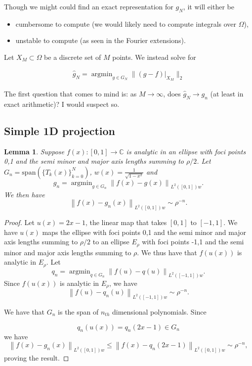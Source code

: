 \documentclass{article}
\DeclareMathOperator*{\argmin}{argmin}
\newtheorem{lemma}[theorem]{Lemma}
\newcommand{\lp}{\left(}
\newcommand{\rp}{\right)}
\newcommand{\C}{\mathbb{C}}
\begin{document}
Though we might could find an exact representation for $g_N$, it will either be
\begin{itemize}
\item cumbersome to compute (we would likely need to compute integrals over $\Omega$),
\item unstable to compute (as seen in the Fourier extensions).
\end{itemize}

Let $X_M \subset \Omega$ be a discrete set of $M$ points. We instead solve for

\begin{align}
\hat{g}_N = \argmin_{g \in G_N} \| \left . (g-f) \right |_{X_M} \|_2
\end{align}

The first question that comes to mind is: as $M \to \infty$, does $\hat{g}_N \to g_n$ (at least in exact arithmetic)? I would suspect so.

\subsection{Simple 1D projection}
\begin{lemma}
Suppose $f(x):[0,1]\to \C$ is analytic in an ellipse with foci points 0,1 and the semi minor and major axis lengths summing to $\rho/2$. Let $G_n = \text{span} \lp \{T_k(x)\}_{k=0}^N \rp$, $w(x) = \frac{1}{\sqrt{1-x^2}}$ and
\begin{equation}
g_n = \argmin_{g \in G_n} \left \| f(x) - g(x) \right \|_{L^2([0,1])w}.
\end{equation}
We then have
\begin{equation}
\left \| f(x) -g_n(x) \right \|_{L^2([0,1])w} \sim \rho^{-n}.
\end{equation}
\end{lemma}
\begin{proof}
Let $u(x)=2x-1$, the linear map that takes $[0,1]$ to $[-1,1]$. We have $u(x)$ maps the ellipse with foci points 0,1 and the semi minor and major axis lengths summing to $\rho/2$ to an ellipse $E_\rho$ with foci points -1,1 and the semi minor and major axis lengths summing to $\rho$. We thus have that $f(u(x))$ is analytic in $E_\rho$. Let
\begin{equation}
q_n = \argmin_{q \in G_n} \left \| f(u) - q(u) \right \|_{L^2([-1,1])w}.
\end{equation}
Since $f(u(x))$ is analytic in $E_\rho$, we have
\begin{equation}
\left \| f(u) - q_n(u) \right \|_{L^2([-1,1])w} \sim \rho^{-n}.
\end{equation}

 We have that $G_n$ is the span of $n_{th}$ dimensional polynomials. Since 
 
 \begin{equation}
 q_n(u(x))=q_n\lp 2x-1 \rp \in G_n
 \end{equation}
we have
 \begin{equation}
\left \| f(x) - g_n(x) \right \|_{L^2([0,1])w} \leq \left \| f(x) - q_n \lp 2x-1 \rp \right \|_{L^2([0,1])w} \sim \rho^{-n},
\end{equation}
proving the result.
\end{proof}
\end{document}

